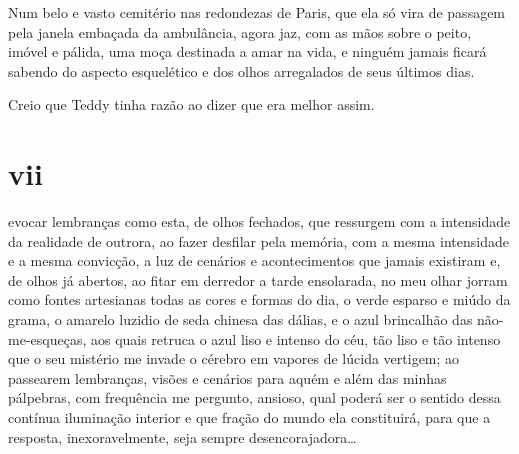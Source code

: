 


Num belo e vasto cemitério nas redondezas de Paris, que ela só vira de
passagem pela janela embaçada da ambulância, agora jaz, com as mãos
sobre o peito, imóvel e pálida, uma moça destinada a amar na vida, e
ninguém jamais ficará sabendo do aspecto esquelético e dos olhos
arregalados de seus últimos dias.




Creio que Teddy tinha razão ao dizer que era melhor assim.

\section{vii}

 evocar lembranças como esta, de olhos fechados, que ressurgem com a
intensidade da realidade de outrora, ao fazer desfilar pela memória, com
a mesma intensidade e a mesma convicção, a luz de cenários e
acontecimentos que jamais existiram e, de olhos já abertos, ao fitar em
derredor a tarde ensolarada, no meu olhar jorram como fontes artesianas
todas as cores e formas do dia, o verde esparso e miúdo da grama, o
amarelo luzidio de seda chinesa das dálias, e o azul brincalhão das
não-me-esqueças, aos quais retruca o azul liso e intenso do céu, tão
liso e tão intenso que o seu mistério me invade o cérebro em vapores de
lúcida vertigem; ao passearem lembranças, visões e cenários para aquém e
além das minhas pálpebras, com frequência me pergunto, ansioso, qual
poderá ser o sentido dessa contínua iluminação interior e que fração do
mundo ela constituirá, para que a resposta, inexoravelmente, seja sempre
desencorajadora\ldots{}

